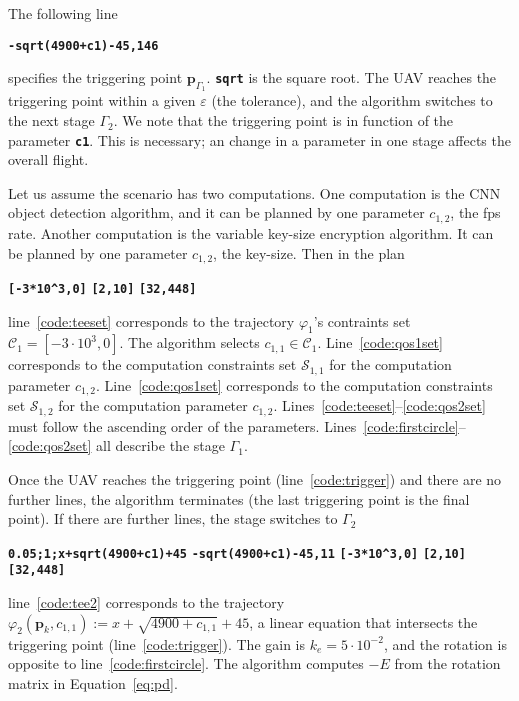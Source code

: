 \documentclass[letterpaper,10pt,conference]{ieeeconf}
\theoremstyle{definition}
\begin{document}
The following line
\begin{algorithmic}[1]
  \State\textbf{\texttt{-sqrt(4900+c1)-45,146}}\label{code:trigger}
\end{algorithmic}
specifies the triggering point $\mathbf{p}_{\Gamma_1}$. {\tt\textbf{sqrt}} is the square root. The UAV reaches the triggering point within a given $\varepsilon$ (the tolerance), and the algorithm switches to the next stage $\Gamma_2$. We note that the triggering point is in function of the parameter {\tt\textbf{c1}}. This is necessary; an change in a parameter in one stage affects the overall flight.

Let us assume the scenario has two computations. One computation is the CNN object detection algorithm, and it can be planned by one parameter $c_{1,2}$, the fps rate. Another computation is the variable key-size encryption algorithm. It can be planned by one parameter $c_{1,2}$, the key-size. Then in the plan
\begin{algorithmic}[1]
  \State\textbf{\texttt{[-3*10\^{}3,0]}}\label{code:teeset}
  \State\textbf{\texttt{[2,10]}}\label{code:qos1set}
  \State\textbf{\texttt{[32,448]}}\label{code:qos2set}
\end{algorithmic}
line~\ref{code:teeset} corresponds to the trajectory $\varphi_1$'s contraints set $\mathcal{C}_1=[-3\cdot10^3,0]$. The algorithm selects $c_{1,1}\in\mathcal{C}_1$. Line~\ref{code:qos1set} corresponds to the computation constraints set $\mathcal{S}_{1,1}$ for the computation parameter $c_{1,2}$. Line~\ref{code:qos1set} corresponds to the computation constraints set $\mathcal{S}_{1,2}$ for the computation parameter $c_{1,2}$. Lines~\ref{code:teeset}--\ref{code:qos2set} must follow the ascending order of the parameters. Lines~\ref{code:firstcircle}--\ref{code:qos2set} all describe the stage $\Gamma_1$.

Once the UAV reaches the triggering point (line~\ref{code:trigger}) and there are no further lines, the algorithm terminates (the last triggering point is the final point). If there are further lines, the stage switches to $\Gamma_2$
\begin{algorithmic}[1]
  \State\textbf{\texttt{0.05;1;x+sqrt(4900+c1)+45}}\label{code:tee2}
  \State\textbf{\texttt{-sqrt(4900+c1)-45,11}}\label{code:trigger2}
  \State\textbf{\texttt{[-3*10\^{}3,0]}}\label{code:teeset2}
  \State\textbf{\texttt{[2,10]}}
  \State\textbf{\texttt{[32,448]}}\label{code:qosset12}
\end{algorithmic}
line~\ref{code:tee2} corresponds to the trajectory $\varphi_2(\mathbf{p}_k,c_{1,1}):=x+\sqrt{4900+c_{1,1}}+45$, a linear equation that intersects the triggering point (line~\ref{code:trigger}). The gain is $k_e=5\cdot 10^{-2}$, and the rotation is opposite to line~\ref{code:firstcircle}. The algorithm computes $-E$ from the rotation matrix in Equation~\ref{eq:pd}. 
\end{document}

